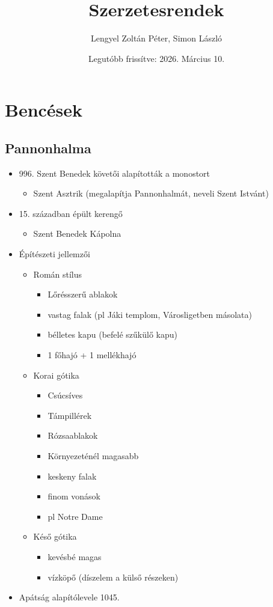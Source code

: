 \documentclass{article}
\title{Szerzetesrendek}
\author{Lengyel Zoltán Péter, Simon László}
\date{Legutóbb frissítve: 2026. Március 10.}
\begin{document}
\maketitle
\tableofcontents
\newpage

\section{Bencések}
\subsection{Pannonhalma}
\begin{itemize}
    \item 996. Szent Benedek követői alapították a monostort
    \begin{itemize}
        \item Szent Asztrik (megalapítja Pannonhalmát, neveli Szent Istvánt)
    \end{itemize}
    \item 15. században épült kerengő
    \begin{itemize}
        \item Szent Benedek Kápolna
    \end{itemize}
    \item Építészeti jellemzői
    \begin{itemize}
        \item Román stílus
        \begin{itemize}
            \item Lőrésszerű ablakok
            \item vastag falak (pl Jáki templom, Városligetben másolata)
            \item bélletes kapu (befelé szűkülő kapu)
            \item 1 főhajó + 1 mellékhajó
        \end{itemize}
        \item Korai gótika 
        \begin{itemize}
            \item Csúcsíves
            \item Támpillérek
            \item Rózsaablakok
            \item Környezeténél magasabb
            \item keskeny falak
            \item finom vonások
            \item pl Notre Dame
        \end{itemize}
        \item Késő gótika
        \begin{itemize}
            \item kevésbé magas
            \item vízköpő (díszelem a külső részeken)
        \end{itemize}
    \end{itemize}
    \item Apátság alapítólevele 1045.
\end{itemize}
\end{document}
